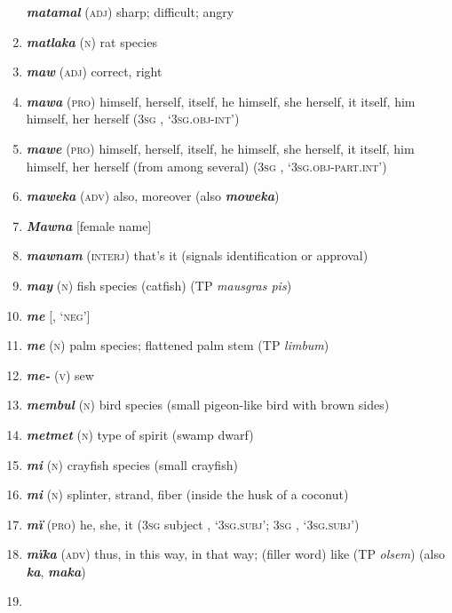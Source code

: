 \begin{enumerate}[noitemsep, label={}, align=left, widest=190, labelsep=1ex,leftmargin=*,itemindent=-10pt]
\textbf{\textit{matamal}} (\textsc{adj}) sharp; difficult; angry \item 
\textbf{\textit{matlaka}} (\textsc{n}) rat species \item 
\textbf{\textit{maw}} (\textsc{adj}) correct, right \item 
\textbf{\textit{mawa}} (\textsc{pro}) himself, herself, itself, he himself, she herself, it itself, him himself, her herself (3\textsc{sg} , ‘\textsc{3sg.obj-int}’) \item 
\textbf{\textit{mawe}} (\textsc{pro}) himself, herself, itself, he himself, she herself, it itself, him himself, her herself (from among several) (3\textsc{sg} , \linebreak‘\textsc{3sg.obj-part.int}’) \item 
\textbf{\textit{maweka}} (\textsc{adv)} also, moreover (also \textbf{\textit{moweka}}) \item 
\textbf{\textit{Mawna}} [female name] \item 
\textbf{\textit{mawnam}} (\textsc{interj}) that’s it (signals  identification or approval) \item 
\textbf{\textit{may}} (\textsc{n}) fish species (catfish) (TP \textit{mausgras pis}) \item 
\textbf{\textit{me}} [, ‘\textsc{neg}’] \item 
\textbf{\textit{me}} (\textsc{n}) palm species; flattened palm stem (TP \textit{limbum}) \item 
\textbf{\textit{me-}} (\textsc{v}) sew \item 
\textbf{\textit{membul}} (\textsc{n}) bird species (small pigeon-like bird with brown sides) \item 
\textbf{\textit{metmet}} (\textsc{n}) type of spirit (swamp dwarf) \item 
\textbf{\textit{mi}} (\textsc{n}) crayfish species (small crayfish) \item 
\textbf{\textit{mi}} (\textsc{n}) splinter, strand, fiber (inside the husk of a coconut) \item 
\textbf{\textit{mï}} (\textsc{pro}) he, she, it (3\textsc{sg} subject , ‘\textsc{3sg.subj}’; 3\textsc{sg} , \linebreak ‘\textsc{3sg.subj}’) \item 
\textbf{\textit{mïka}} (\textsc{adv)} thus, in this way, in that way; (filler word) like (TP \textit{olsem}) (also \textbf{\textit{ka}}, \textbf{\textit{maka}}) \item 

\end{enumerate}
